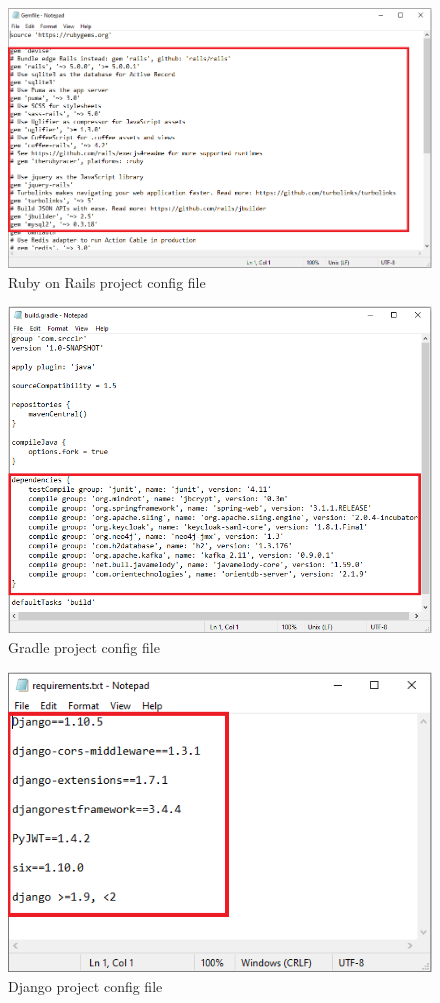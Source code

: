 \begin{figure}[H]
	\includegraphics[width=15cm]{includes/ruby.PNG}
	\centering
	\caption{Ruby on Rails project config file}
	\label{fig:ruby}
\end{figure}
\begin{figure}[H]
	\includegraphics[width=15cm]{includes/gradle.PNG}
	\centering
	\caption{Gradle project config file}
	\label{fig:gradle}
\end{figure}
\begin{figure}[H]
	\includegraphics[width=15cm]{includes/django.PNG}
	\centering
	\caption{Django project config file}
	\label{fig:django}
\end{figure}
